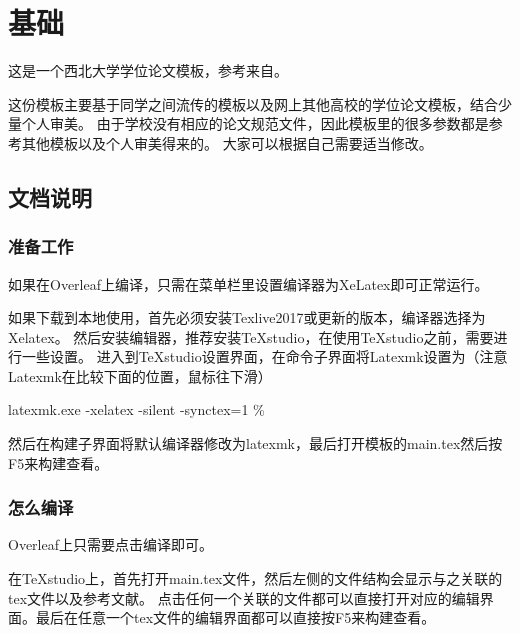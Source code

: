\chapter[基础]{基础}  %
\songti{}
\linespread{1.67} \selectfont
这是一个西北大学学位论文模板，参考来自\href{https://www.overleaf.com/latex/templates/shan-xi-shi-fan-da-xue-li-gong-ke-lei-ben-ke-sheng-bi-ye-lun-wen-texmo-ban/rkxzpttqqzyt}{\color{red}{陕西师范大学模板}}。

这份模板主要基于同学之间流传的模板以及网上其他高校的学位论文模板，结合少量个人审美。
由于学校没有相应的论文规范文件，因此模板里的很多参数都是参考其他模板以及个人审美得来的。
大家可以根据自己需要适当修改。

\section{文档说明}

\subsection{准备工作}

如果在Overleaf上编译，只需在菜单栏里设置编译器为XeLatex即可正常运行。

如果下载到本地使用，首先必须安装Texlive2017或更新的版本，编译器选择为Xelatex。
然后安装编辑器，推荐安装TeXstudio，在使用TeXstudio之前，需要进行一些设置。
进入到TeXstudio设置界面，在命令子界面将Latexmk设置为（注意Latexmk在比较下面的位置，鼠标往下滑）

{\centering latexmk.exe -xelatex -silent -synctex=1 \% \par}
然后在构建子界面将默认编译器修改为latexmk，最后打开模板的main.tex然后按F5来构建查看。

\subsection{怎么编译}

Overleaf上只需要点击编译即可。

在TeXstudio上，首先打开main.tex文件，然后左侧的文件结构会显示与之关联的tex文件以及参考文献。
点击任何一个关联的文件都可以直接打开对应的编辑界面。最后在任意一个tex文件的编辑界面都可以直接按F5来构建查看。

